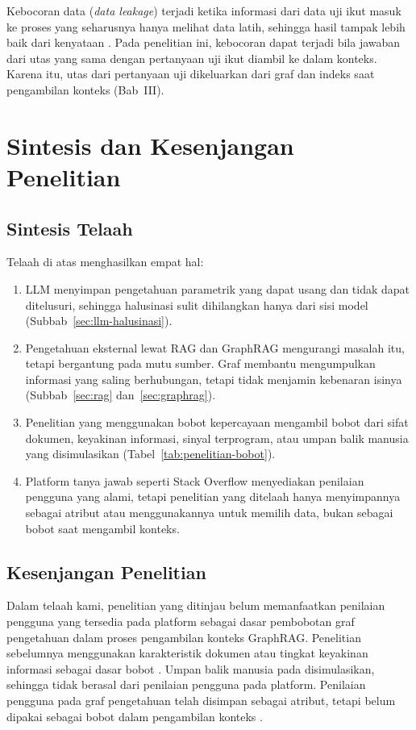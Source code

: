 Kebocoran data (\emph{data leakage}) terjadi ketika informasi dari data uji ikut masuk ke proses yang seharusnya hanya melihat data latih, sehingga hasil tampak lebih baik dari kenyataan \autocite{Kapoor2023}. Pada penelitian ini, kebocoran dapat terjadi bila jawaban dari utas yang sama dengan pertanyaan uji ikut diambil ke dalam konteks. Karena itu, utas dari pertanyaan uji dikeluarkan dari graf dan indeks saat pengambilan konteks (Bab~III).

\section{Sintesis dan Kesenjangan Penelitian}
\label{sec:sintesis}

\subsection{Sintesis Telaah}

Telaah di atas menghasilkan empat hal:
\begin{enumerate}
  \item LLM menyimpan pengetahuan parametrik yang dapat usang dan tidak dapat
ditelusuri, sehingga halusinasi sulit dihilangkan hanya dari sisi model (Subbab~\ref{sec:llm-halusinasi}).
  \item Pengetahuan eksternal lewat RAG dan GraphRAG mengurangi masalah itu,
tetapi bergantung pada mutu sumber. Graf membantu mengumpulkan informasi yang saling berhubungan, tetapi tidak menjamin kebenaran isinya (Subbab~\ref{sec:rag} dan~\ref{sec:graphrag}).
  \item Penelitian yang menggunakan bobot kepercayaan mengambil bobot dari sifat
dokumen, keyakinan informasi, sinyal terprogram, atau umpan balik manusia yang disimulasikan (Tabel~\ref{tab:penelitian-bobot}).
  \item Platform tanya jawab seperti Stack Overflow menyediakan penilaian pengguna
yang alami, tetapi penelitian yang ditelaah hanya menyimpannya sebagai atribut atau menggunakannya untuk memilih data, bukan sebagai bobot saat mengambil konteks.
\end{enumerate}

\subsection{Kesenjangan Penelitian}

Dalam telaah kami, penelitian yang ditinjau belum memanfaatkan penilaian pengguna yang tersedia pada platform sebagai dasar pembobotan graf pengetahuan dalam proses pengambilan konteks GraphRAG. Penelitian sebelumnya menggunakan karakteristik dokumen atau tingkat keyakinan informasi sebagai dasar bobot \autocite{Shi2026, Asghari2026, TAMRplus2026, Yu2026DoG}. Umpan balik manusia pada \textcite{LiTrustProp2026} disimulasikan, sehingga tidak berasal dari penilaian pengguna pada platform. Penilaian pengguna pada graf pengetahuan telah disimpan sebagai atribut, tetapi belum dipakai sebagai bobot dalam pengambilan konteks \autocite{Kleybolte2026, Banerjee2024}.

